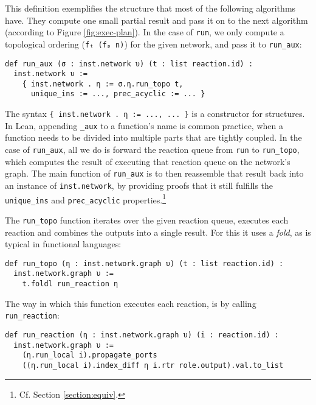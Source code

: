 \noindent This definition exemplifies the structure that most of the following algorithms have.
They compute one small partial result and pass it on to the next algorithm (according to Figure \ref{fig:exec-plan}).
In the case of \lstinline{run}, we only compute a topological ordering (\lstinline{fₜ (fₚ n)}) for the given network, and pass it to \lstinline{run_aux}:

\begin{lstlisting}
def run_aux (σ : inst.network υ) (t : list reaction.id) : 
  inst.network υ :=
    { inst.network . η := σ.η.run_topo t, 
      unique_ins := ..., prec_acyclic := ... }
\end{lstlisting}

\noindent The syntax \lstinline|{ inst.network . η := ..., ... }| is a constructor for structures.
In Lean, appending \lstinline{_aux} to a function's name is common practice, when a function needs to be divided into multiple parts that are tightly coupled.
In the case of \lstinline{run_aux}, all we do is forward the reaction queue from \lstinline{run} to \lstinline{run_topo}, which computes the result of executing that reaction queue on the network's graph.
The main function of \lstinline{run_aux} is to then reassemble that result back into an instance of \lstinline{inst.network}, by providing proofs that it still fulfills the \lstinline{unique_ins} and \lstinline{prec_acyclic} properties.\footnote{
  Cf. Section \ref{section:equiv}.
}

\vspace{3mm}

\noindent The \lstinline{run_topo} function iterates over the given reaction queue, executes each reaction and combines the outputs into a single result.
For this it uses a \emph{fold}, as is typical in functional languages:

\begin{lstlisting}
def run_topo (η : inst.network.graph υ) (t : list reaction.id) : 
  inst.network.graph υ := 
    t.foldl run_reaction η
\end{lstlisting}

\noindent The way in which this function executes each reaction, is by calling \lstinline{run_reaction}:

\begin{lstlisting}
def run_reaction (η : inst.network.graph υ) (i : reaction.id) : 
  inst.network.graph υ :=
    (η.run_local i).propagate_ports 
    ((η.run_local i).index_diff η i.rtr role.output).val.to_list
\end{lstlisting}

